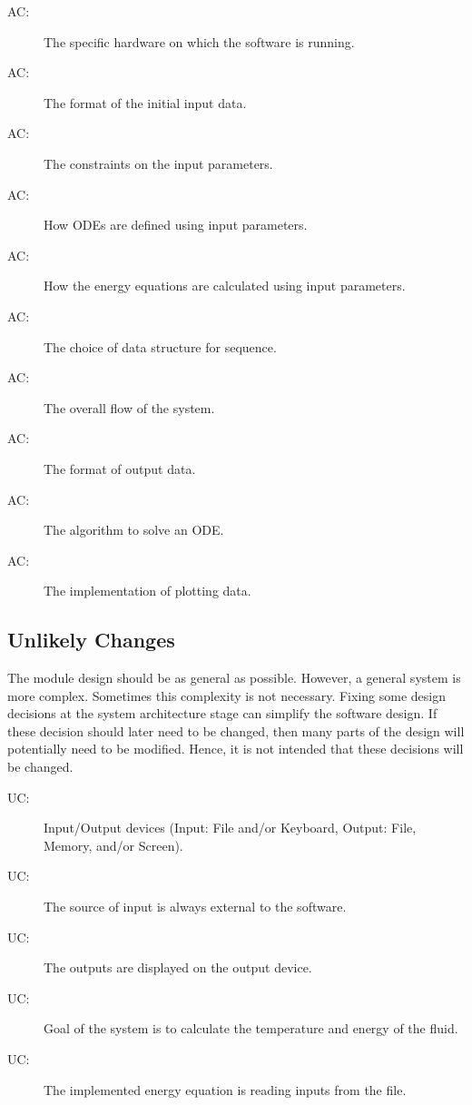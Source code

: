 \documentclass[12pt, titlepage]{article}
\newcounter{acnum}
\newcommand{\actheacnum}{AC\theacnum}
\newcounter{ucnum}
\newcommand{\uctheucnum}{UC\theucnum}
\begin{document}
\begin{description}
\item[ \actheacnum \label{1_ac}:] The specific
  hardware on which the software is running.
\item[ \actheacnum \label{2_ac}:] The format of the initial input data.
\item[ \actheacnum \label{3_ac}:] The constraints on the input parameters. 
\item[ \actheacnum \label{4_ac}:] How ODEs are defined using input parameters. 
\item[ \actheacnum \label{5_ac}:] How the energy equations are calculated using input parameters. 
\item[ \actheacnum \label{6_ac}:] The choice of data structure for sequence.
\item[ \actheacnum \label{7_ac}:] The overall flow of the system. 
\item[ \actheacnum \label{8_ac}:] The format of output data. 
\item[ \actheacnum \label{9_ac}:] The algorithm to solve an ODE. 
\item[ \actheacnum \label{10_ac}:] The implementation of plotting data. 


\end{description}

\subsection{Unlikely Changes} \label{SecUchange}

The module design should be as general as possible. However, a general system is
more complex. Sometimes this complexity is not necessary. Fixing some design
decisions at the system architecture stage can simplify the software design. If
these decision should later need to be changed, then many parts of the design
will potentially need to be modified. Hence, it is not intended that these
decisions will be changed.

\begin{description}
\item[ \uctheucnum \label{ucIO_1}:] Input/Output devices
  (Input: File and/or Keyboard, Output: File, Memory, and/or Screen).
\item[ \uctheucnum \label{ucInput_2}:] The source of input is always external to the software. 
\item[ \uctheucnum \label{ucOutput_3}:] The outputs are displayed on the output device. 
\item[ \uctheucnum \label{ucGoal_4}:] Goal of the system is to calculate the temperature and energy of the fluid.
\item[ \uctheucnum \label{ucEnergy_7}:] The implemented energy equation is reading inputs from the file.  

\end{description}
\end{document}
